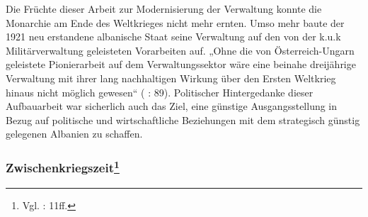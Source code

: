 Die Früchte dieser Arbeit zur Modernisierung der Verwaltung konnte die Monarchie am Ende des Weltkrieges nicht mehr ernten. Umso mehr baute der 1921 neu erstandene albanische Staat seine Verwaltung auf den von der k.u.k Militärverwaltung geleisteten Vorarbeiten auf. „Ohne die von Österreich-Ungarn geleistete Pionierarbeit auf dem Verwaltungssektor wäre eine beinahe dreijährige Verwaltung mit ihrer lang nachhaltigen Wirkung über den Ersten Weltkrieg hinaus nicht möglich gewesen“ (\cite{schwanke} : 89). Politischer Hintergedanke dieser Aufbauarbeit war sicherlich auch das Ziel, eine günstige Ausgangsstellung in Bezug auf politische und wirtschaftliche Beziehungen mit dem strategisch günstig gelegenen Albanien zu schaffen.

\subsubsection[Zwischenkriegszeit]{Zwischenkriegszeit\footnote{Vgl. \cite{vollmer07} : 11ff.}}

